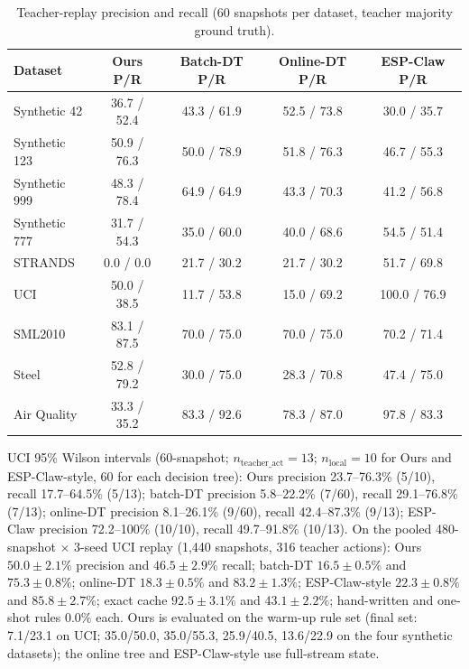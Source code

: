 \documentclass[11pt,a4paper]{article}
\begin{document}
\begin{table}[t]
\centering
\caption{Teacher-replay precision and recall (60 snapshots per dataset,
teacher majority ground truth).}
\label{tab:pr}
\footnotesize
\begin{tabular}{lcccc}
\toprule
Dataset & Ours P/R & Batch-DT P/R & Online-DT P/R & ESP-Claw P/R \\
\midrule
Synthetic 42 & 36.7 / 52.4 & 43.3 / 61.9 & 52.5 / 73.8 & 30.0 / 35.7 \\
Synthetic 123 & 50.9 / 76.3 & 50.0 / 78.9 & 51.8 / 76.3 & 46.7 / 55.3 \\
Synthetic 999 & 48.3 / 78.4 & 64.9 / 64.9 & 43.3 / 70.3 & 41.2 / 56.8 \\
Synthetic 777 & 31.7 / 54.3 & 35.0 / 60.0 & 40.0 / 68.6 & 54.5 / 51.4 \\
STRANDS & 0.0 / 0.0 & 21.7 / 30.2 & 21.7 / 30.2 & 51.7 / 69.8 \\
UCI & 50.0 / 38.5 & 11.7 / 53.8 & 15.0 / 69.2 & 100.0 / 76.9 \\
SML2010 & 83.1 / 87.5 & 70.0 / 75.0 & 70.0 / 75.0 & 70.2 / 71.4 \\
Steel & 52.8 / 79.2 & 30.0 / 75.0 & 28.3 / 70.8 & 47.4 / 75.0 \\
Air Quality & 33.3 / 35.2 & 83.3 / 92.6 & 78.3 / 87.0 & 97.8 / 83.3 \\
\bottomrule
\end{tabular}
\end{table}

UCI 95\% Wilson intervals (60-snapshot; $n_\mathrm{teacher\_act} = 13$;
$n_\mathrm{local} = 10$ for Ours and ESP-Claw-style, $60$ for each decision
tree): Ours precision 23.7--76.3\% (5/10), recall 17.7--64.5\% (5/13);
batch-DT precision 5.8--22.2\% (7/60), recall 29.1--76.8\% (7/13); online-DT
precision 8.1--26.1\% (9/60), recall 42.4--87.3\% (9/13); ESP-Claw precision
72.2--100\% (10/10), recall 49.7--91.8\% (10/13). On the pooled
480-snapshot $\times$ 3-seed UCI replay (1,440 snapshots, 316 teacher
actions): Ours $50.0 \pm 2.1\%$ precision and $46.5 \pm 2.9\%$ recall;
batch-DT $16.5 \pm 0.5\%$ and $75.3 \pm 0.8\%$; online-DT $18.3 \pm 0.5\%$
and $83.2 \pm 1.3\%$; ESP-Claw-style $22.3 \pm 0.8\%$ and $85.8 \pm 2.7\%$;
exact cache $92.5 \pm 3.1\%$ and $43.1 \pm 2.2\%$; hand-written and one-shot
rules 0.0\% each. Ours is evaluated on the warm-up rule set (final set:
7.1/23.1 on UCI; 35.0/50.0, 35.0/55.3, 25.9/40.5, 13.6/22.9 on the four
synthetic datasets); the online tree and ESP-Claw-style use full-stream
state.
\end{document}
